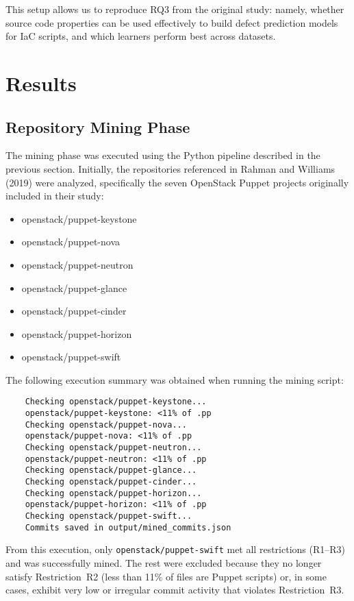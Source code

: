 \documentclass[conference]{IEEEtran}
\begin{document}
	This setup allows us to reproduce RQ3 from the original study: namely, whether source code properties can be used effectively to build defect prediction models for IaC scripts, and which learners perform best across datasets.
	
	
	
\section{Results}
\subsection{Repository Mining Phase}
The mining phase was executed using the Python pipeline described in the previous section. Initially, the repositories referenced in Rahman and Williams (2019) were analyzed, specifically the seven OpenStack Puppet projects originally included in their study:

\begin{itemize}
	\item openstack/puppet-keystone
	\item openstack/puppet-nova
	\item openstack/puppet-neutron
	\item openstack/puppet-glance
	\item openstack/puppet-cinder
	\item openstack/puppet-horizon
	\item openstack/puppet-swift
\end{itemize}

The following execution summary was obtained when running the mining script:

\begin{verbatim}
	Checking openstack/puppet-keystone...
	openstack/puppet-keystone: <11% of .pp
	Checking openstack/puppet-nova...
	openstack/puppet-nova: <11% of .pp
	Checking openstack/puppet-neutron...
	openstack/puppet-neutron: <11% of .pp
	Checking openstack/puppet-glance...
	Checking openstack/puppet-cinder...
	Checking openstack/puppet-horizon...
	openstack/puppet-horizon: <11% of .pp
	Checking openstack/puppet-swift...
	Commits saved in output/mined_commits.json
\end{verbatim}

From this execution, only \texttt{openstack/puppet-swift} met all restrictions (R1–R3) and was successfully mined. The rest were excluded because they no longer satisfy Restriction~R2 (less than 11\% of files are Puppet scripts) or, in some cases, exhibit very low or irregular commit activity that violates Restriction~R3.
\end{document}
